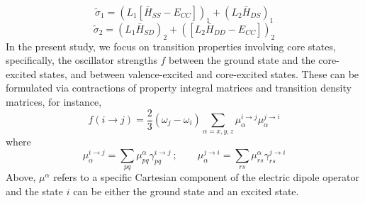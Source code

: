 \documentclass[journal=jctcce,manuscript=article]{achemso}
\begin{document}
\begin{equation} 
\tilde{\sigma}_1 = (L_1[\bar{H}_{SS}-E_{CC}])_1 + (L_2\bar{H}_{DS})_1
\end{equation}
\begin{equation} 
\tilde{\sigma}_2 = (L_1\bar{H}_{SD})_2 + ([L_2\bar{H}_{DD}-E_{CC}])_2
\end{equation}
{}
%
In the present study, we focus on transition properties involving core states, specifically, the oscillator strengths $f$ between the ground state and the core-excited states, and between valence-excited and core-excited states. 
These can be formulated via contractions of property integral matrices and transition density matrices, for instance,
\begin{equation}
f (i \to j) = \frac{2}{3}(\omega_j - \omega_i) \sum_{\alpha=x,y,z} \mu^{i\to j}_{\alpha} 
\mu^{j\to i}_{\alpha}
\end{equation}
where 
\begin{equation}
\mu_\alpha^{i\to j}
= \sum_{pq} \mu^{\alpha}_{pq} \gamma^{ i\to j}_{pq}~; \quad \quad
\mu_\alpha^{j\to i} = \sum_{rs} \mu^{\alpha}_{rs} \gamma^{j\to i }_{rs}
\label{strength}
\end{equation}
Above, $\mu^\alpha$ refers to a specific Cartesian component of the electric dipole operator and the state $i$ can be either the ground state and an excited state.
\end{document}
